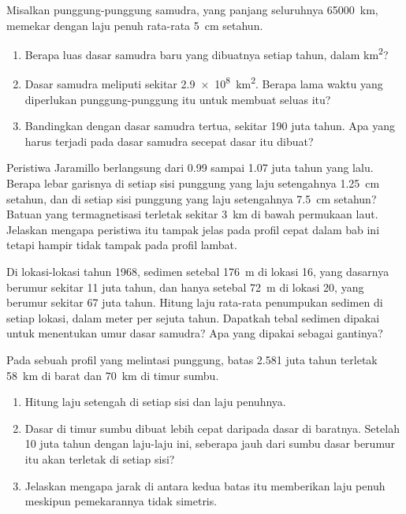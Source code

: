 \begin{exercise}[$\star\star\star$]\label{exo:g11:drift-to-spreading:12}
Misalkan punggung-punggung samudra, yang panjang seluruhnya \qty{65000}{km},
memekar dengan laju penuh rata-rata \qty{5}{cm} setahun.
\begin{enumerate}
  \item Berapa luas dasar samudra baru yang dibuatnya setiap tahun, dalam
        \unit{km^2}?
  \item Dasar samudra meliputi sekitar \qty{2.9e8}{km^2}. Berapa lama waktu
        yang diperlukan punggung-punggung itu untuk membuat seluas itu?
  \item Bandingkan dengan dasar samudra tertua, sekitar \num{190} juta tahun.
        Apa yang harus terjadi pada dasar samudra secepat dasar itu dibuat?
\end{enumerate}
\end{exercise}

\begin{exercise}[$\star\star\star$]\label{exo:g11:drift-to-spreading:13}
Peristiwa Jaramillo berlangsung dari \num{0.99} sampai \num{1.07} juta tahun
yang lalu. Berapa lebar garisnya di setiap sisi punggung yang laju setengahnya
\qty{1.25}{cm} setahun, dan di setiap sisi punggung yang laju setengahnya
\qty{7.5}{cm} setahun? Batuan yang termagnetisasi terletak sekitar \qty{3}{km}
di bawah permukaan laut. Jelaskan mengapa peristiwa itu tampak jelas pada
profil cepat dalam bab ini tetapi hampir tidak tampak pada profil lambat.
\end{exercise}

\begin{exercise}[$\star\star\star$]\label{exo:g11:drift-to-spreading:14}
Di lokasi-lokasi tahun 1968, sedimen setebal \qty{176}{m} di lokasi 16, yang
dasarnya berumur sekitar \num{11} juta tahun, dan hanya setebal \qty{72}{m} di
lokasi 20, yang berumur sekitar \num{67} juta tahun. Hitung laju rata-rata
penumpukan sedimen di setiap lokasi, dalam meter per sejuta tahun. Dapatkah
tebal sedimen dipakai untuk menentukan umur dasar samudra? Apa yang dipakai
sebagai gantinya?
\end{exercise}

\begin{exercise}[$\star\star\star$]\label{exo:g11:drift-to-spreading:15}
Pada sebuah profil yang melintasi punggung, batas \num{2.581} juta tahun
terletak \qty{58}{km} di barat dan \qty{70}{km} di timur sumbu.
\begin{enumerate}
  \item Hitung laju setengah di setiap sisi dan laju penuhnya.
  \item Dasar di timur sumbu dibuat lebih cepat daripada dasar di baratnya.
        Setelah 10 juta tahun dengan laju-laju ini, seberapa jauh dari sumbu
        dasar berumur itu akan terletak di setiap sisi?
  \item Jelaskan mengapa jarak di antara kedua batas itu memberikan laju penuh
        meskipun pemekarannya tidak simetris.
\end{enumerate}
\end{exercise}

